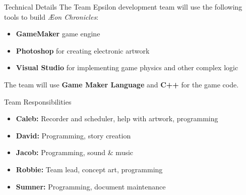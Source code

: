 \documentclass{teamepsilon}
\begin{document}
\begin{frame}{Technical Details}
    The Team Epsilon development team will use the following tools to build
    \textit{{\AE}on Chronicles}:

    \begin{itemize}
        \item \textbf{GameMaker} game engine
        \item \textbf{Photoshop} for creating electronic artwork
        \item \textbf{Visual Studio} for implementing game physics and other
            complex logic
    \end{itemize}

    The team will use \textbf{Game Maker Language} and \textbf{C++} for the game
    code.
\end{frame}

\begin{frame}{Team Responsibilities}
    \begin{itemize}
        \item \textbf{Caleb:} Recorder and scheduler, help with artwork,
        programming
        \item \textbf{David:} Programming, story creation
        \item \textbf{Jacob:} Programming, sound \& music
        \item \textbf{Robbie:} Team lead, concept art, programming
        \item \textbf{Sumner:} Programming, document maintenance
    \end{itemize}
\end{frame}
\end{document}
